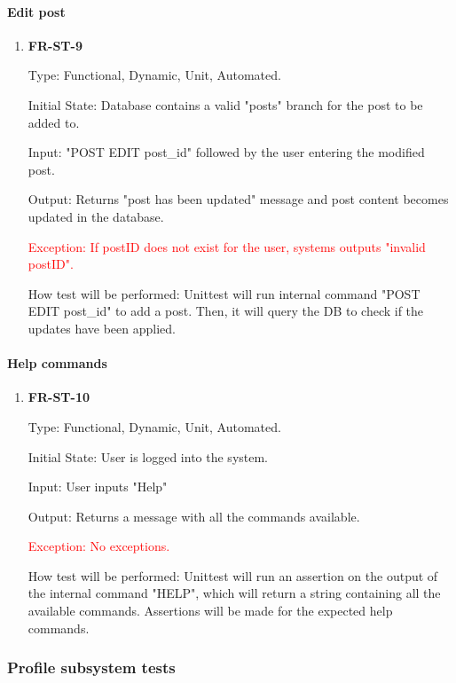 \documentclass[12pt, titlepage]{article}
\begin{document}
\paragraph{Edit post}	
\begin{enumerate}
\item{\textbf{FR-ST-9}}

Type: Functional, Dynamic, Unit, Automated.
					
Initial State: Database contains a valid "posts" branch for the post to be added to.
					
Input: "POST EDIT post\_id" followed by the user entering the modified post.
					
Output: Returns "post has been updated" message and post content becomes updated in the database.

\textcolor{red}{Exception: If postID does not exist for the user, systems outputs "invalid postID".}
					
How test will be performed: Unittest will run internal command "POST EDIT post\_id" to add a post. Then, it will query the DB to check if the updates have been applied.
\end{enumerate}

\paragraph{Help commands}	
\begin{enumerate}
\item{\textbf{FR-ST-10}}

Type: Functional, Dynamic, Unit, Automated.
					
Initial State: User is logged into the system.
					
Input: User inputs "Help"
					
Output: Returns a message with all the commands available.

\textcolor{red}{Exception: No exceptions.}
					
How test will be performed: Unittest will run an assertion on the output of the internal command "HELP", which will return a string containing all the available commands. Assertions will be made for the expected help commands.
\end{enumerate}

\subsubsection{Profile subsystem tests}
		
\end{document}
